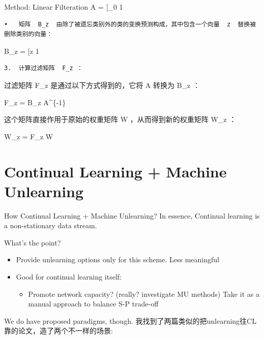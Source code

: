 \documentclass[
  ignorenonframetext,
  aspectratio=169,
]{beamer}
\providecommand{\tightlist}{%
  \setlength{\itemsep}{0pt}\setlength{\parskip}{0pt}}\usepackage{longtable,booktabs,array}
\begin{document}
\begin{frame}[fragile]{Method: Linear Filteration}
A = {[}\_0 \textbar{} 1 \textbar{} \cdots \textbar{}
\mathbf{a}{k-1}{]}

\begin{verbatim}
•   矩阵  B_z  由除了被遗忘类别外的类的变换预测构成，其中包含一个向量  z  替换被删除类别的向量：
\end{verbatim}

B\_z = {[}z \textbar{} 1 \textbar{} \cdots \textbar{}
\mathbf{a}{k-1}{]}

\begin{verbatim}
3.  计算过滤矩阵  F_z ：
\end{verbatim}

过滤矩阵 F\_z 是通过以下方式得到的，它将 A 转换为 B\_z ：

F\_z = B\_z A\^{}\{-1\}

这个矩阵直接作用于原始的权重矩阵 W ，从而得到新的权重矩阵 W\_z ：

W\_z = F\_z W
\end{frame}

\section{Continual Learning + Machine
Unlearning}\label{continual-learning-machine-unlearning}

\begin{frame}{How Continual Learning + Machine Unlearning?}
\label{how-continual-learning-machine-unlearning}
In essence, Continual learning is a non-stationary data stream.

What's the point?

\begin{itemize}
\tightlist
\item
  Provide unlearning options only for this scheme. Less meaningful
\item
  Good for continual learning itself:

  \begin{itemize}
  \tightlist
  \item
    Promote network capacity? (really? investigate MU methods) Take it
    as a manual approach to balance S-P trade-off
  \end{itemize}
\end{itemize}
\end{frame}

\begin{frame}{We do have proposed paradigms, though.}
\label{we-do-have-proposed-paradigms-though.}
我找到了两篇类似的把unlearning往CL靠的论文，造了两个不一样的场景:
\end{frame}
\end{document}
